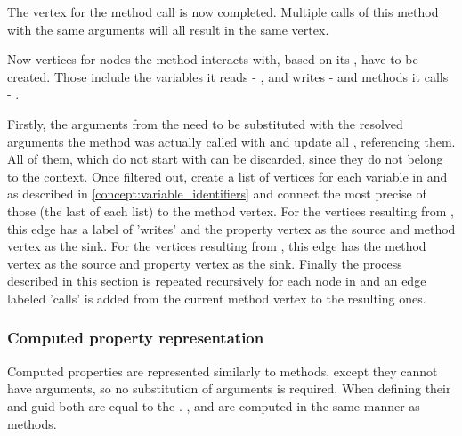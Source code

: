 The vertex for the method call is now completed. Multiple calls of this method with the same arguments will all result in the same vertex.

Now vertices for nodes the method interacts with, based on its , have to be created. Those include the variables it reads - , and writes -  and methods it calls - . 

Firstly, the arguments from the  need to be substituted with the resolved arguments the method was actually called with and update all ,    referencing them. All of them, which do not start with  can be discarded, since they do not belong to the context. Once filtered out, create a list of vertices for each variable in  and  as described in \ref{concept:variable_identifiers} and connect the most precise of those (the last of each list) to the method vertex. For the vertices resulting from , this edge has a label of 'writes' and the property vertex as the source and method vertex as the sink. For the vertices resulting from , this edge has the method vertex as the source and property vertex as the sink. 
Finally the process described in this section is repeated recursively for each  node in  and an edge labeled 'calls' is added from the current method vertex to the resulting ones. 

\subsubsection{Computed property representation}
\label{concept:computed_property}

Computed properties are represented similarly to methods, except they cannot have arguments, so no substitution of arguments is required. When defining their  and \gls{guid} both are equal to the . ,  and  are computed in the same manner as methods. 

